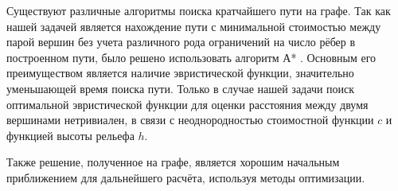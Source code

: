 \par 
Существуют различные алгоритмы поиска кратчайшего пути на графе. Так как нашей задачей является нахождение пути с минимальной стоимостью между парой вершин без учета различного рода ограничений на число рёбер в построенном пути, было решено использовать алгоритм А* \cite{A_star}. Основным его преимуществом является наличие эвристической функции, значительно уменьшающей время поиска пути. Только в случае нашей задачи поиск оптимальной эвристической функции для оценки расстояния между двумя вершинами нетривиален, в связи с неоднородностью стоимостной функции $c$ и функцией высоты рельефа $h$.
\par
Также решение, полученное на графе, является хорошим начальным приближением для дальнейшего расчёта, используя методы оптимизации.
